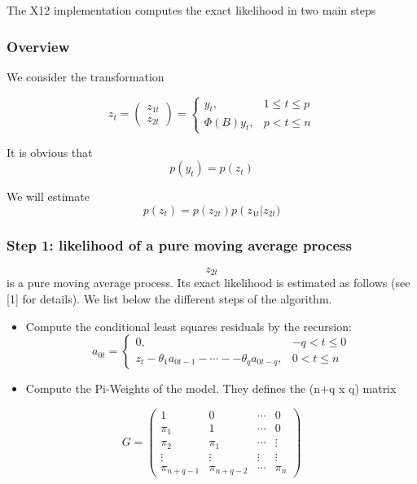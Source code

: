 \documentclass[
]{book}
\begin{document}
The X12 implementation computes the exact likelihood in two main steps

\hypertarget{overview}{%
\subsubsection{Overview}\label{overview}}

We consider the transformation

\[ z_t = \begin{pmatrix} z_{1t} \\ z_{2t} \end{pmatrix} = \begin{cases} y_t, & 1 \le t \le p \\ \Phi\left(B\right) y_t, & p \lt t \le n\end{cases}\]

It is obvious that
\[ p\left(y_t\right) = p\left(z_t\right) \]

We will estimate
\[ p\left(z_t\right) = p\left(z_{2t}\right)  p\left(z_{1t}\right | z_{2t} )\]

\hypertarget{step-1-likelihood-of-a-pure-moving-average-process}{%
\subsubsection{Step 1: likelihood of a pure moving average process}\label{step-1-likelihood-of-a-pure-moving-average-process}}

\[z_{2t}\]
is a pure moving average process. Its exact likelihood is estimated as follows (see {[}1{]} for details).
We list below the different steps of the algorithm.

\begin{itemize}
\item
  Compute the conditional least squares residuals by the recursion:
  \[ a_{0t} = \begin{cases} 0,& -q \lt t \leq 0 \\ z_t-\theta_1 a_{0t-1}- \cdots --\theta_q a_{0t-q},&  0 \lt t \leq n  \end{cases} \]
\item
  Compute the Pi-Weights of the model. They defines the (n+q x q) matrix
\end{itemize}

\[ G = \begin{pmatrix} 1 & 0 & \cdots & 0 \\ \pi_1 & 1 & \cdots & 0 \\ \pi_2 & \pi_1 & \cdots & \vdots\\ \vdots & \vdots & \vdots & \vdots \\ \pi_{n+q-1} & \pi_{n+q-2} & \cdots & \pi_{n} \end{pmatrix} \]
\end{document}
